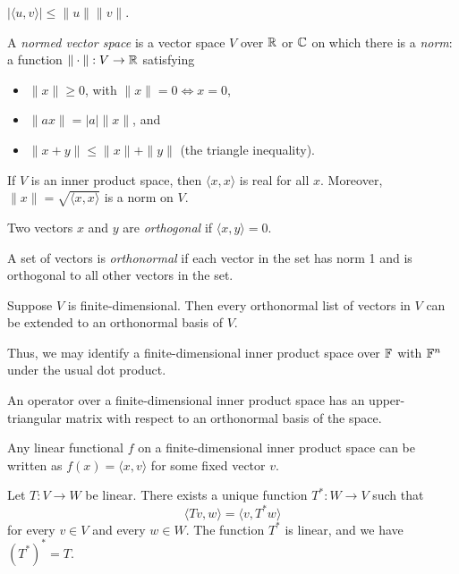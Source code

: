 \begin{prop}
  $|\langle u,v\rangle|\le \|u\|\|v\|$.
\end{prop}
\begin{defn}
  A \emph{normed vector space} is a vector space $V$ over $\mathbb{R}$ or $\mathbb{C}$
  on which there is a \emph{norm}: a function $\|\cdot\|:V\to\mathbb{R}$ satisfying
  \begin{itemize}
    \item $\| x\|\ge 0$, with $\|x\|=0\iff x=0$,
    \item $\|a x\|=|a|\| x\|$, and
    \item $\| x+ y\|\le\| x\|+\| y\|$ (the triangle
      inequality).
  \end{itemize}
\end{defn}
\begin{prop}
  If $V$ is an inner product space, then $\langle x, x\rangle$ is
  real for all $ x$.
  Moreover, $\| x\|=\sqrt{\langle x, x\rangle}$ is a norm
  on $V$.
\end{prop}
\begin{defn}
  Two vectors $ x$ and $ y$ are \emph{orthogonal} if $\langle
   x, y\rangle=0$.

  A set of vectors is \emph{orthonormal} if each vector in the set has norm 1
  and is orthogonal to all other vectors in the set.
\end{defn}
\begin{prop}
  Suppose $V$ is finite-dimensional. Then every orthonormal list of vectors in
  $V$ can be extended to an orthonormal basis of $V$.
\end{prop}
\begin{rem}
  Thus, we may identify a finite-dimensional inner product space over $\mathbb{F}$ with
  $\mathbb{F}^n$ under the usual dot product.
\end{rem}
\begin{thm}[Schur]
  An operator over a finite-dimensional inner product space has an
  upper-triangular matrix with respect to an orthonormal basis of the space.
\end{thm}
\begin{thm}
  Any linear functional $f$ on a finite-dimensional inner product space can be
  written as $f(x)=\langle x,v\rangle$ for some fixed vector $v$.
\end{thm}
\begin{prop}
  Let $T:V\to W$ be linear. There exists a unique function $T^*:W\to V$ such
  that
  \[\langle Tv,w\rangle=\langle v,T^* w\rangle\] for every $v\in V$ and every
  $w\in W$. The function $T^*$ is linear, and we have $(T^*)^*=T$.
\end{prop}
